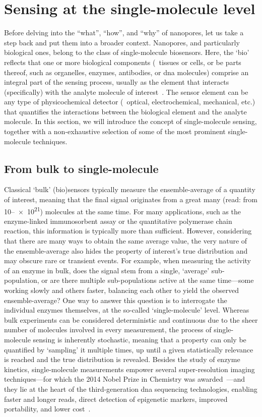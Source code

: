 %
%
\section{Sensing at the single-molecule level}
%

Before delving into the ``what'', ``how'', and ``why'' of nanopores, let us take a step back and put them into
a broader context. Nanopores, and particularly biological ones, belong to the class of single-molecule
biosensors. Here, the `bio' reflects that one or more biological components (\eg~tissues or cells, or be parts
thereof, such as organelles, enzymes, antibodies, or \gls{dna} molecules) comprise an integral part of the
sensing process, usually as the element that interacts (specifically) with the analyte molecule of
interest~\cite{Banica-2012}. The sensor element can be any type of physicochemical detector (\eg~optical,
electrochemical, mechanical, etc.) that quantifies the interactions between the biological element and the
analyte molecule. In this section, we will introduce the concept of single-molecule sensing, together with a
non-exhaustive selection of some of the most prominent single-molecule techniques.

\subsection{From bulk to single-molecule}

Classical `bulk' (bio)sensors typically measure the ensemble-average of a quantity of interest, meaning that
the final signal originates from a great many (read: from \numrange{10}{e21}) molecules at the same time. For
many applications, such as the enzyme-linked immunosorbent assay or the quantitative polymerase chain
reaction, this information is typically more than sufficient. However, considering that there are many ways to
obtain the same average value, the very nature of the ensemble-average also hides the property of interest's
true distribution and may obscure rare or transient events. For example, when measuring the activity of an
enzyme in bulk, does the signal stem from a single, `average' sub-population, or are there multiple
sub-populations active at the same time---some working slowly and others faster, balancing each other to yield
the observed ensemble-average? One way to answer this question is to interrogate the individual enzymes
themselves, at the so-called `single-molecule' level. Whereas bulk experiments can be considered deterministic
and continuous due to the sheer number of molecules involved in every measurement, the process of
single-molecule sensing is inherently stochastic, meaning that a property can only be quantified by
`sampling' it multiple times, up until a given statistically relevance is reached and the true distribution is
revealed. Besides the study of enzyme kinetics, single-molecule measurements empower several super-resolution
imaging techniques---for which the 2014 Nobel Prize in Chemistry was awarded~\cite{Weiss-2014}---and they lie
at the heart of the third-generation \gls{dna} sequencing technologies, enabling faster and longer reads,
direct detection of epigenetic markers, improved portability, and lower cost~\cite{Schadt-2010}.

